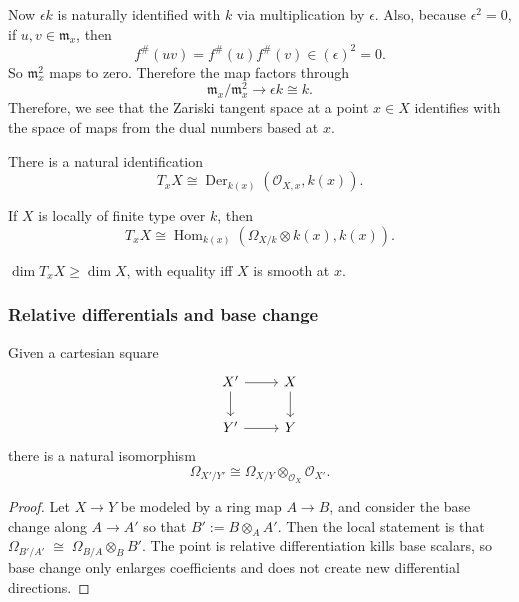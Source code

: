 \documentclass[12pt]{article}
\begin{document}
Now \(\epsilon k\) is naturally identified with \(k\) via multiplication by $\epsilon$. Also, because \(\epsilon^2=0\), if \(u,v\in \mathfrak m_x\), then
\[
    f^\#(uv)=f^\#(u)f^\#(v)\in (\epsilon)^2=0.
\]
So \(\mathfrak m_x^2\) maps to zero. Therefore the map factors through
\[
    \mathfrak m_x/\mathfrak m_x^2 \longrightarrow \epsilon k \cong k.
\] Therefore, we see that the Zariski tangent space at a point $x\in X$ identifies with the space of maps from the dual numbers based at $x$.

\begin{proposition}
    There is a natural identification
    \[
        T_x X \cong \operatorname{Der}_{k(x)}(\mathcal O_{X,x}, k(x)).
    \]
\end{proposition}

\begin{proposition}
    If $X$ is locally of finite type over $k$, then
    \[
        T_x X \cong \operatorname{Hom}_{k(x)}(\Omega_{X/k} \otimes k(x), k(x)).
    \]
\end{proposition}

\begin{corollary}
    $\dim T_x X \ge \dim X$, with equality iff $X$ is smooth at $x$.
\end{corollary}

\subsubsection{Relative differentials and base change}

\begin{proposition}
    Given a cartesian square
    \[
        \begin{tikzcd}
            X' \arrow[r] \arrow[d] & X \arrow[d] \\
            Y' \arrow[r] & Y
        \end{tikzcd}
    \]
    there is a natural isomorphism
    \[
        \Omega_{X'/Y'} \cong \Omega_{X/Y} \otimes_{\mathcal O_X} \mathcal O_{X'}.
    \]
\end{proposition}

\begin{proof}
    Let $X \to Y$ be modeled by a ring map $A \to B$, and consider the base change along $A \to A'$ so that $B' := B \otimes_A A'$. Then the local statement is that $\Omega_{B'/A'} \;\cong\; \Omega_{B/A} \otimes_B B'$. The point is relative differentiation kills base scalars, so base change only enlarges coefficients and does not create new differential directions.
\end{proof}
\end{document}
